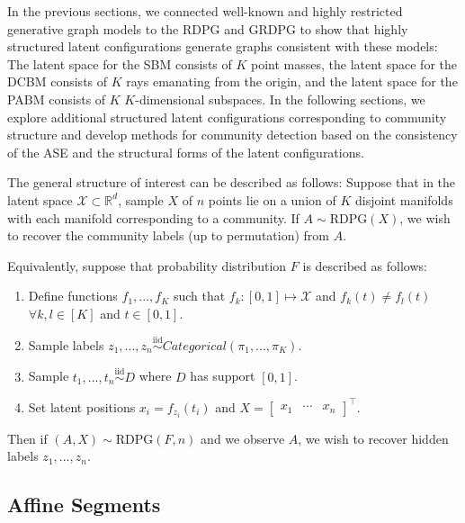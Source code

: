 \documentclass[
  11pt,
]{article}
\providecommand{\tightlist}{%
  \setlength{\itemsep}{0pt}\setlength{\parskip}{0pt}}
\begin{document}
In the previous sections, we connected well-known and highly restricted
generative graph models to the RDPG and GRDPG to show that highly
structured latent configurations generate graphs consistent with these
models: The latent space for the SBM consists of \(K\) point masses, the
latent space for the DCBM consists of \(K\) rays emanating from the
origin, and the latent space for the PABM consists of \(K\)
\(K\)-dimensional subspaces. In the following sections, we explore
additional structured latent configurations corresponding to community
structure and develop methods for community detection based on the
consistency of the ASE and the structural forms of the latent
configurations.

The general structure of interest can be described as follows: Suppose
that in the latent space \(\mathcal{X} \subset \mathbb{R}^d\), sample
\(X\) of \(n\) points lie on a union of \(K\) disjoint manifolds with
each manifold corresponding to a community. If
\(A \sim \text{RDPG}(X)\), we wish to recover the community labels (up
to permutation) from \(A\).

Equivalently, suppose that probability distribution \(F\) is described
as follows:

\begin{enumerate}
\def\labelenumi{\arabic{enumi}.}
\tightlist
\item
  Define functions \(f_1, ..., f_K\) such that
  \(f_k : [0, 1] \mapsto \mathcal{X}\) and \(f_k(t) \neq f_l(t)\)
  \(\forall k, l \in [K]\) and \(t \in [0, 1]\).
\item
  Sample labels
  \(z_1, ..., z_n \stackrel{\text{iid}}{\sim}Categorical(\pi_1, ..., \pi_K)\).
\item
  Sample \(t_1, ..., t_n \stackrel{\text{iid}}{\sim}D\) where \(D\) has
  support \([0, 1]\).
\item
  Set latent positions \(x_i = f_{z_i}(t_i)\) and
  \(X = \begin{bmatrix} x_1 & \cdots & x_n \end{bmatrix}^\top\).
\end{enumerate}

Then if \((A, X) \sim \text{RDPG}(F, n)\) and we observe \(A\), we wish
to recover hidden labels \(z_1, ..., z_n\).

\hypertarget{affine-segments}{%
\subsection{Affine Segments}\label{affine-segments}}
\end{document}
